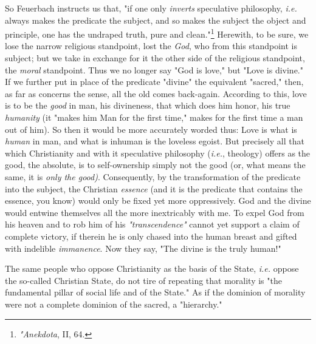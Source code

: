 \documentclass[a4paper]{book}
\begin{document}
So Feuerbach instructs us that, "{}if one only \textit{inverts} speculative 
philosophy, \textit{i.e.} always makes the predicate the subject, and so makes 
the subject the object and principle, one has the undraped truth, pure and 
clean."{}\footnote{\textit{"{}Anekdota}, II, 64.} Herewith, to be sure, we 
lose the narrow religious standpoint, lost the \textit{God}, who from this 
standpoint is subject; but we take in exchange for it the other side of the 
religious standpoint, the \textit{moral} standpoint. Thus we no longer say 
"{}God is love,"{} but "{}Love is divine."{} If we further put in place of the 
predicate "{}divine"{} the equivalent "{}sacred,"{} then, as far as concerns 
the sense, all the old comes back-again. According to this, love is to be the 
\textit{good} in man, his divineness, that which does him honor, his true 
\textit{humanity} (it "{}makes him Man for the first time,"{} makes for the 
first time a man out of him). So then it would be more accurately worded thus: 
Love is what is \textit{human} in man, and what is inhuman is the loveless 
egoist. But precisely all that which Christianity and with it speculative 
philosophy (\textit{i.e.}, theology) offers as the good, the absolute, is to 
self-ownership simply not the good (or, what means the same, it is 
\textit{only the good)}. Consequently, by the transformation of the predicate 
into the subject, the Christian \textit{essence} (and it is the predicate that 
contains the essence, you know) would only be fixed yet more oppressively. God 
and the divine would entwine themselves all the more inextricably with me. To 
expel God from his heaven and to rob him of his \textit{"{}transcendence"{}} 
cannot yet support a claim of complete victory, if therein he is only chased 
into the human breast and gifted with indelible \textit{immanence}. Now they 
say, "{}The divine is the truly human!"{}

The same people who oppose Christianity as the basis of the State, 
\textit{i.e.} oppose the so-called Christian State, do not tire of repeating 
that morality is "{}the fundamental pillar of social life and of the State."{} 
As if the dominion of morality were not a complete dominion of the sacred, a 
"{}hierarchy."{}
\end{document}
